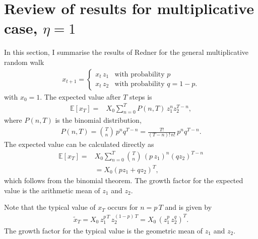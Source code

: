 \documentclass[11pt]{article}
\begin{document}
\section{Review of results for multiplicative case, $\eta = 1$}
In this section, I summarise the results of Redner \cite{redner1990random}  for the general multiplicative random walk 
\begin{align}
\label{eq-multiplicativeRandomWalk}
x_{t+1} = \left\{ 
\begin{array}{ll}
x_t \, z_1 & \text{with probability $p$}\\
x_t \, z_2  & \text{with probability $q=1-p$}.
\end{array}
\right.
\end{align}
with $x_0 = 1$.
The expected value after $T$ steps is
\begin{align}
 \mathbb{E}\left[x_T \right] =& X_0 \sum_{n=0}^T  P(n,T) \, z_1^n z_2^{T-n},
\end{align}
where $P(n,T)$ is the binomial distribution,
\begin{align}
P(n, T) = {T \choose n}\, p^n q^{T-n} =  \frac{T!}{(T-n)!\,n!}\, p^n q^{T-n}.
\end{align}
The expected value can be calculated directly as
\begin{align}
\nonumber  \mathbb{E}\left[x_T \right] =&X_0 \sum_{n=0}^T  {T \choose n} \, (p\,z_1)^n (q z_2)^{T-n}\\
\label{eq-Ex-mult-exact}& = X_0 \left(p z_1 + q z_2 \right)^T,
\end{align}
which follows from the binomial theorem. The growth factor for the expected value is the
arithmetic mean of $z_1$ and $z_2$.

Note that the typical value of $x_T$ occurs for $n = p\,T$ and is given by
\begin{align}
\label{eq-typical-value-mult}
\widetilde{x}_T = X_0\,z_1^{p\,T}\,z_2^{(1-p)\,T} = X_0\,\left(z_1^p\,z_2^q \right)^T.
\end{align}
The growth factor for the typical value is the geometric mean of $z_1$ and $z_2$.
\end{document}
